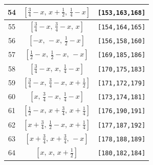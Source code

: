 \documentclass[fleqn,8pt]{jsarticle}
\begin{document}
\begin{longtable}{ccc}
54 & $\left[ \frac{3}{4} - x,\, x + \frac{1}{2},\, \frac{1}{4} - x \right]$ & {\tt [153,163,168]} \\ \hline
55 & $\left[ \frac{3}{4} - x,\, \frac{3}{4} - x,\, x \right]$ & {\tt [154,164,165]} \\ \hline
56 & $\left[ - x,\, - x,\, \frac{1}{2} - x \right]$ & {\tt [156,158,160]} \\ \hline
57 & $\left[ \frac{1}{2} - x,\, \frac{1}{2} - x,\, - x \right]$ & {\tt [169,185,186]} \\ \hline
58 & $\left[ \frac{3}{4} - x,\, x,\, \frac{1}{4} - x \right]$ & {\tt [170,175,183]} \\ \hline
59 & $\left[ \frac{3}{4} - x,\, \frac{3}{4} - x,\, x + \frac{1}{2} \right]$ & {\tt [171,172,179]} \\ \hline
60 & $\left[ x,\, \frac{3}{4} - x,\, \frac{1}{4} - x \right]$ & {\tt [173,174,181]} \\ \hline
61 & $\left[ \frac{1}{2} - x,\, x + \frac{3}{4},\, x + \frac{1}{4} \right]$ & {\tt [176,190,191]} \\ \hline
62 & $\left[ x + \frac{3}{4},\, \frac{1}{2} - x,\, x + \frac{1}{4} \right]$ & {\tt [177,187,192]} \\ \hline
63 & $\left[ x + \frac{3}{4},\, x + \frac{3}{4},\, - x \right]$ & {\tt [178,188,189]} \\ \hline
64 & $\left[ x,\, x,\, x + \frac{1}{2} \right]$ & {\tt [180,182,184]} \\
\end{longtable}
\renewcommand{\arraystretch}{1.2}
\end{document}
